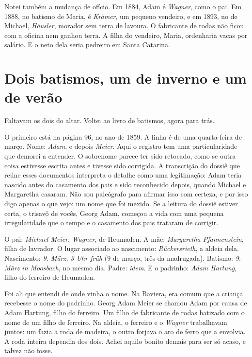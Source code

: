 \documentclass[
  brazilian,
  11pt,
  openany]{book}
\begin{document}
Notei também a mudança de ofício. Em 1884, Adam é \emph{Wagner}, como o
pai. Em 1888, no batismo de Maria, é \emph{Krämer}, um pequeno vendeiro,
e em 1893, no de Michael, \emph{Häusler}, morador sem terra de lavoura.
O fabricante de rodas não ficou com a oficina nem ganhou terra. A filha
do vendeiro, Maria, ordenharia vacas por salário. E o neto dela seria
pedreiro em Santa Catarina.

\section{Dois batismos, um de inverno e um de
verão}\label{dois-batismos-um-de-inverno-e-um-de-veruxe3o}

Faltavam os dois do altar. Voltei ao livro de batismos, agora para trás.

O primeiro está na página 96, no ano de 1859. A linha é de uma
quarta-feira de março. Nome: \emph{Adam}, e depois \emph{Meier}. Aqui o
registro tem uma particularidade que demorei a entender. O sobrenome
parece ter sido retocado, como se outra coisa estivesse escrita antes e
tivesse sido corrigida. A transcrição do dossiê que reúne esses
documentos interpreta o detalhe como uma legitimação: Adam teria nascido
antes do casamento dos pais e sido reconhecido depois, quando Michael e
Margaretha casaram. Não sou paleógrafo para afirmar isso com certeza, e
por isso digo apenas o que vejo: um nome que foi mexido. Se a leitura do
dossiê estiver certa, o trisavô de vocês, Georg Adam, começou a vida com
uma pequena irregularidade que o tempo e o casamento dos pais trataram
de corrigir.

O pai: \emph{Michael Meier}, \emph{Wagner}, de Heumaden. A mãe:
\emph{Margaretha Pfannenstein}, filha de lavrador. O lugar associado ao
nascimento: \emph{Rückersrieth}, a aldeia dela. Nascimento: \emph{9.
März, 3 Uhr früh} (9 de março, três da madrugada). Batismo: \emph{9.
März in Moosbach}, no mesmo dia. Padre: \emph{idem}. E o padrinho:
\emph{Adam Hartung}, filho do ferreiro de Heumaden.

Foi ali que entendi de onde vinha o nome. Na Baviera, era comum que a
criança recebesse o nome do padrinho. Georg Adam Meier se chamou Adam
por causa de Adam Hartung, filho do ferreiro. Um filho de fabricante de
rodas batizado com o nome de um filho de ferreiro. Na aldeia, o ferreiro
e o \emph{Wagner} trabalhavam juntos: um fazia a roda de madeira, o
outro forjava o aro de ferro que a envolvia. A roda inteira dependia dos
dois. Achei aquilo bonito demais para ser só acaso, e talvez não fosse.
\end{document}

